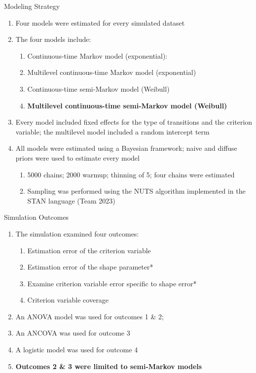 \documentclass[
  ignorenonframetext,
]{beamer}
\providecommand{\tightlist}{%
  \setlength{\itemsep}{0pt}\setlength{\parskip}{0pt}}
\begin{document}
\begin{frame}{Modeling Strategy}
\label{modeling-strategy}
\begin{enumerate}
\tightlist
\item
  Four models were estimated for every simulated dataset
\item
  The four models include:

  \begin{enumerate}
  \tightlist
  \item
    Continuous-time Markov model (exponential):
  \item
    Multilevel continuous-time Markov model (exponential)
  \item
    Continuous-time semi-Markov model (Weibull)
  \item
    \textbf{Multilevel continuous-time semi-Markov model (Weibull)}
  \end{enumerate}
\item
  Every model included fixed effects for the type of transitions and the
  criterion variable; the multilevel model included a random intercept
  term
\item
  All models were estimated using a Bayesian framework; naive and
  diffuse priors were used to estimate every model

  \begin{enumerate}
  \tightlist
  \item
    5000 chains; 2000 warmup; thinning of 5; four chains were estimated
  \item
    Sampling was performed using the NUTS algorithm implemented in the
    STAN language (Team 2023)
  \end{enumerate}
\end{enumerate}
\end{frame}

\begin{frame}{Simulation Outcomes}
\label{simulation-outcomes}
\begin{enumerate}
\tightlist
\item
  The simulation examined four outcomes:

  \begin{enumerate}
  \tightlist
  \item
    Estimation error of the criterion variable
  \item
    Estimation error of the shape parameter*
  \item
    Examine criterion variable error specific to shape error*
  \item
    Criterion variable coverage
  \end{enumerate}
\item
  An ANOVA model was used for outcomes 1 \& 2;
\item
  An ANCOVA was used for outcome 3
\item
  A logistic model was used for outcome 4
\item
  \textbf{Outcomes 2 \& 3 were limited to semi-Markov models}
\end{enumerate}
\end{frame}
\end{document}
